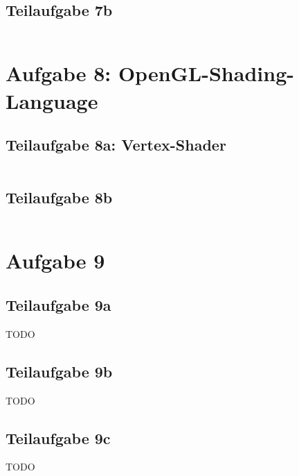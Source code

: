 \documentclass[a4paper]{scrartcl}
\begin{document}
\subsection*{Teilaufgabe 7b}
\inputminted[linenos, numbersep=5pt, tabsize=4, frame=lines, label=7b.cpp]{cpp}{7b.cpp}

\section*{Aufgabe 8: OpenGL-Shading-Language}
\subsection*{Teilaufgabe 8a: Vertex-Shader}
\inputminted[linenos, numbersep=5pt, tabsize=4, frame=lines, label=shader8a.vert]{glsl}{shader8a.vert}

\clearpage
\subsection*{Teilaufgabe 8b}
\inputminted[linenos, numbersep=5pt, tabsize=4, frame=lines, label=shader8b.frag]{glsl}{shader8b.frag}

\clearpage
\section*{Aufgabe 9}
\subsection*{Teilaufgabe 9a}
TODO
\subsection*{Teilaufgabe 9b}
TODO
\subsection*{Teilaufgabe 9c}
TODO
\end{document}
